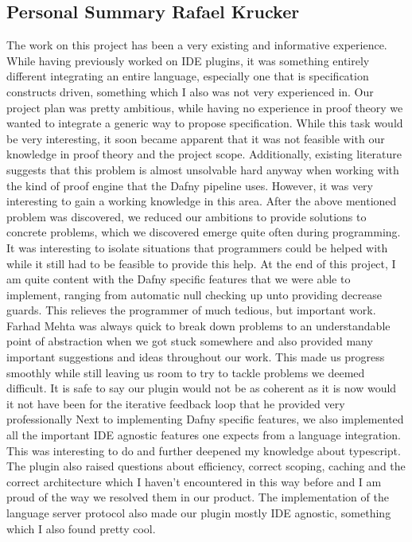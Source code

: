 \subsection{Personal Summary Rafael Krucker}
The work on this project has been a very existing and informative experience. While having previously worked on IDE plugins, it was something entirely different integrating an entire language, especially one that is specification constructs driven, something which I also was not very experienced in. \newline
Our project plan was pretty ambitious, while having no experience in proof theory we wanted to integrate a generic way to propose specification. While this task would be very interesting, it soon became apparent that it was not feasible with our knowledge in proof theory and the project scope. Additionally, existing literature suggests that this problem is almost unsolvable hard anyway when working with the kind of proof engine that the Dafny pipeline uses. However, it was very interesting to gain a working knowledge in this area. \newline
After the above mentioned problem was discovered, we reduced our ambitions to provide solutions to concrete problems, which we discovered emerge quite often during programming. It was interesting to isolate situations that programmers could be helped with while it still had to be feasible to provide this help. At the end of this project, I am quite content with the Dafny specific features that we were able to implement, ranging from automatic null checking up unto providing decrease guards. This relieves the programmer of much tedious, but important work. \newline
Farhad Mehta was always quick to break down problems to an understandable point of abstraction when we got stuck somewhere and also provided many important suggestions and ideas throughout our work. This made us progress smoothly while still leaving us room to try to tackle problems we deemed difficult. It is safe to say our plugin would not be as coherent as it is now would it not have been for the iterative feedback loop that he provided very professionally \newline
Next to implementing Dafny specific features, we also implemented all the important IDE agnostic features one expects from a language integration. This was interesting to do and further deepened my knowledge about typescript. The plugin also raised questions about efficiency, correct scoping, caching and the correct architecture which I haven't encountered in this way before and I am proud of the way we resolved them in our product. The implementation of the language server protocol also made our plugin mostly IDE agnostic, something which I also found pretty cool. \newline 
